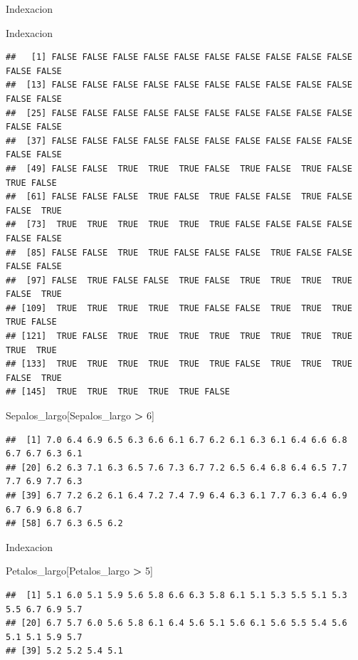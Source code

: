 \documentclass[
  ignorenonframetext,
]{beamer}
\newenvironment{Shaded}{\begin{snugshade}}{\end{snugshade}}
\newcommand{\DecValTok}[1]{\textcolor[rgb]{0.00,0.00,0.81}{#1}}
\newcommand{\NormalTok}[1]{#1}
\newcommand{\SpecialCharTok}[1]{\textcolor[rgb]{0.81,0.36,0.00}{\textbf{#1}}}
\begin{document}
\begin{frame}[fragile]{Indexacion}
\begin{block}{Indexacion}
\begin{verbatim}
##   [1] FALSE FALSE FALSE FALSE FALSE FALSE FALSE FALSE FALSE FALSE FALSE FALSE
##  [13] FALSE FALSE FALSE FALSE FALSE FALSE FALSE FALSE FALSE FALSE FALSE FALSE
##  [25] FALSE FALSE FALSE FALSE FALSE FALSE FALSE FALSE FALSE FALSE FALSE FALSE
##  [37] FALSE FALSE FALSE FALSE FALSE FALSE FALSE FALSE FALSE FALSE FALSE FALSE
##  [49] FALSE FALSE  TRUE  TRUE  TRUE FALSE  TRUE FALSE  TRUE FALSE  TRUE FALSE
##  [61] FALSE FALSE FALSE  TRUE FALSE  TRUE FALSE FALSE  TRUE FALSE FALSE  TRUE
##  [73]  TRUE  TRUE  TRUE  TRUE  TRUE  TRUE FALSE FALSE FALSE FALSE FALSE FALSE
##  [85] FALSE FALSE  TRUE  TRUE FALSE FALSE FALSE  TRUE FALSE FALSE FALSE FALSE
##  [97] FALSE  TRUE FALSE FALSE  TRUE FALSE  TRUE  TRUE  TRUE  TRUE FALSE  TRUE
## [109]  TRUE  TRUE  TRUE  TRUE  TRUE FALSE FALSE  TRUE  TRUE  TRUE  TRUE FALSE
## [121]  TRUE FALSE  TRUE  TRUE  TRUE  TRUE  TRUE  TRUE  TRUE  TRUE  TRUE  TRUE
## [133]  TRUE  TRUE  TRUE  TRUE  TRUE  TRUE FALSE  TRUE  TRUE  TRUE FALSE  TRUE
## [145]  TRUE  TRUE  TRUE  TRUE  TRUE FALSE
\end{verbatim}

\begin{Shaded}
\begin{Highlighting}[]
\NormalTok{Sepalos\_largo[Sepalos\_largo }\SpecialCharTok{\textgreater{}} \DecValTok{6}\NormalTok{]}
\end{Highlighting}
\end{Shaded}

\begin{verbatim}
##  [1] 7.0 6.4 6.9 6.5 6.3 6.6 6.1 6.7 6.2 6.1 6.3 6.1 6.4 6.6 6.8 6.7 6.7 6.3 6.1
## [20] 6.2 6.3 7.1 6.3 6.5 7.6 7.3 6.7 7.2 6.5 6.4 6.8 6.4 6.5 7.7 7.7 6.9 7.7 6.3
## [39] 6.7 7.2 6.2 6.1 6.4 7.2 7.4 7.9 6.4 6.3 6.1 7.7 6.3 6.4 6.9 6.7 6.9 6.8 6.7
## [58] 6.7 6.3 6.5 6.2
\end{verbatim}
\end{block}

\begin{block}{Indexacion}
\protect\hypertarget{indexacion-4}{}
\begin{Shaded}
\begin{Highlighting}[]
\NormalTok{Petalos\_largo[Petalos\_largo }\SpecialCharTok{\textgreater{}} \DecValTok{5}\NormalTok{]}
\end{Highlighting}
\end{Shaded}

\begin{verbatim}
##  [1] 5.1 6.0 5.1 5.9 5.6 5.8 6.6 6.3 5.8 6.1 5.1 5.3 5.5 5.1 5.3 5.5 6.7 6.9 5.7
## [20] 6.7 5.7 6.0 5.6 5.8 6.1 6.4 5.6 5.1 5.6 6.1 5.6 5.5 5.4 5.6 5.1 5.1 5.9 5.7
## [39] 5.2 5.2 5.4 5.1
\end{verbatim}


\end{block}
\end{frame}
\end{document}
